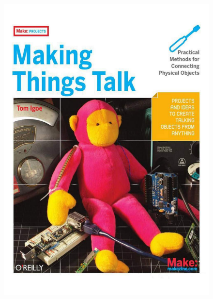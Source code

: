 \documentclass[screen, aspectratio=43]{beamer}
\begin{document}
\begin{frame}
\begin{figure}
\includegraphics[scale=0.12]{img/makingthingstalk.pdf}

\end{figure}
\end{frame}
\end{document}
